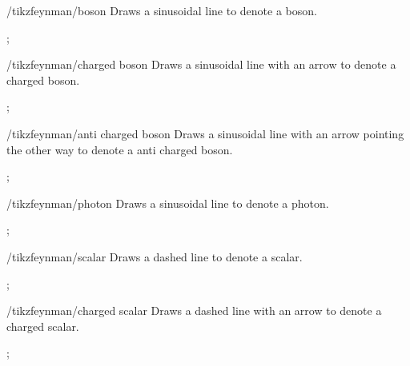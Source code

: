 \documentclass[a4paper,final]{ltxdoc}
\begin{document}
\begin{key}{/tikzfeynman/boson}
  Draws a sinusoidal line to denote a boson.

\begin{codeexample}[]
;
\end{codeexample}
\end{key}

\begin{key}{/tikzfeynman/charged boson}
  Draws a sinusoidal line with an arrow to denote a charged boson.

\begin{codeexample}[]
;
\end{codeexample}
\end{key}

\begin{key}{/tikzfeynman/anti charged boson}
  Draws a sinusoidal line with an arrow pointing the other way to denote a anti charged boson.

\begin{codeexample}[]
;
\end{codeexample}
\end{key}

\begin{key}{/tikzfeynman/photon}
  Draws a sinusoidal line to denote a photon.

\begin{codeexample}[]
;
\end{codeexample}
\end{key}

\begin{key}{/tikzfeynman/scalar}
  Draws a dashed line to denote a scalar.

\begin{codeexample}[]
;
\end{codeexample}
\end{key}

\begin{key}{/tikzfeynman/charged scalar}
  Draws a dashed line with an arrow to denote a charged scalar.

\begin{codeexample}[]
;
\end{codeexample}
\end{key}
\end{document}

